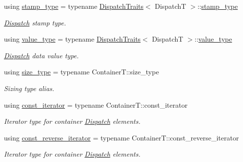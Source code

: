 \begin{DoxyCompactItemize}
\item 
\mbox{\label{classflow_1_1_dispatch_queue_a7908f3d78b7f1767462244b94434d748}} 
using \hyperlink{classflow_1_1_dispatch_queue_a7908f3d78b7f1767462244b94434d748}{stamp\+\_\+type} = typename \hyperlink{structflow_1_1_dispatch_traits}{Dispatch\+Traits}$<$ DispatchT $>$\+::\hyperlink{classflow_1_1_dispatch_queue_a7908f3d78b7f1767462244b94434d748}{stamp\+\_\+type}
\begin{DoxyCompactList}\small\item\em \hyperlink{classflow_1_1_dispatch}{Dispatch} stamp type. \end{DoxyCompactList}\item 
\mbox{\label{classflow_1_1_dispatch_queue_a2414c7db207bbc3bab885aded66cff08}} 
using \hyperlink{classflow_1_1_dispatch_queue_a2414c7db207bbc3bab885aded66cff08}{value\+\_\+type} = typename \hyperlink{structflow_1_1_dispatch_traits}{Dispatch\+Traits}$<$ DispatchT $>$\+::\hyperlink{classflow_1_1_dispatch_queue_a2414c7db207bbc3bab885aded66cff08}{value\+\_\+type}
\begin{DoxyCompactList}\small\item\em \hyperlink{classflow_1_1_dispatch}{Dispatch} data value type. \end{DoxyCompactList}\item 
\mbox{\label{classflow_1_1_dispatch_queue_afdc67058e3461410fdd6170046df55bc}} 
using \hyperlink{classflow_1_1_dispatch_queue_afdc67058e3461410fdd6170046df55bc}{size\+\_\+type} = typename Container\+T\+::size\+\_\+type
\begin{DoxyCompactList}\small\item\em Sizing type alias. \end{DoxyCompactList}\item 
\mbox{\label{classflow_1_1_dispatch_queue_a307496fdc34a2d59e11114dabf85dc8a}} 
using \hyperlink{classflow_1_1_dispatch_queue_a307496fdc34a2d59e11114dabf85dc8a}{const\+\_\+iterator} = typename Container\+T\+::const\+\_\+iterator
\begin{DoxyCompactList}\small\item\em Iterator type for container \hyperlink{classflow_1_1_dispatch}{Dispatch} elements. \end{DoxyCompactList}\item 
\mbox{\label{classflow_1_1_dispatch_queue_ac74f1a9a8d77b06e9576492df2a50e4f}} 
using \hyperlink{classflow_1_1_dispatch_queue_ac74f1a9a8d77b06e9576492df2a50e4f}{const\+\_\+reverse\+\_\+iterator} = typename Container\+T\+::const\+\_\+reverse\+\_\+iterator
\begin{DoxyCompactList}\small\item\em Iterator type for container \hyperlink{classflow_1_1_dispatch}{Dispatch} elements. \end{DoxyCompactList}\end{DoxyCompactItemize}
